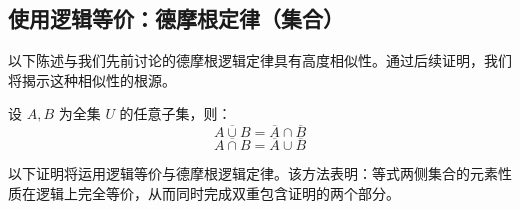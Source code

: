 \subsection{使用逻辑等价：德摩根定律（集合）}\label{sec:section4.6.6}

以下陈述与我们先前讨论的德摩根逻辑定律具有高度相似性。通过后续证明，我们将揭示这种相似性的根源。

\begin{theorem}\label{theorem4.6.9}
    设 $A, B$ 为全集 $U$ 的任意子集，则：
    \[\overline{A \cup B} = \overline{A} \cap \overline{B}\]
    \[\overline{A \cap B} = \overline{A} \cup \overline{B}\]
\end{theorem}

以下证明将运用逻辑等价与德摩根逻辑定律。该方法表明：等式两侧集合的元素性质在逻辑上完全等价，从而同时完成双重包含证明的两个部分。

